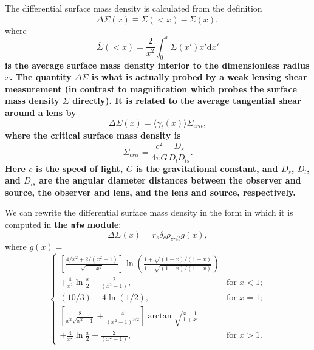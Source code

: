 \documentclass[twocolumn]{aastex6}
\newcommand{\code}{\lstinline[style=codeintext]}
\begin{document}
The differential surface mass density is calculated from the definition
\begin{equation}\label{dsigma}
\Delta\Sigma(x) \equiv  \overline{\Sigma}(<x) - \Sigma(x),
\end{equation}
where
\begin{equation}\label{sigbar}
\overline{\Sigma}(<x) = \frac{2}{x^2} \int_0^{x} \Sigma(x') x' \mathrm{d}x'
\end{equation}
{\bf is the average surface mass density interior to the dimensionless radius $x$. The quantity $\Delta\Sigma$ is what is actually probed by a weak lensing shear measurement (in contrast to magnification which probes the surface mass density $\Sigma$ directly). It is related to the average tangential shear around a lens by}
\begin{equation}
\Delta\Sigma(x) = \langle \gamma_t(x) \rangle \Sigma_{crit},
\end{equation}
{\bf where the critical surface mass density is}
\begin{equation}
\Sigma_{crit} = \frac{c^2}{4 \pi G}\frac{D_s}{D_l D_{ls}}.
\end{equation}
{\bf Here $c$ is the speed of light, $G$ is the gravitational constant, and $D_s$, $D_l$, and $D_{ls}$ are the angular diameter distances between the observer and source, the observer and lens, and the lens and source, respectively.}

We can rewrite the differential surface mass density in the form in which it is computed in {\bf the \code{nfw} module}:
\begin{equation}
     \Delta\Sigma(x) = r_s \delta_c \rho_{crit} g(x),
\end{equation}
where  $g(x) = $
\begin{equation}
    \begin{cases}

    \left[ \frac{4 / x^2 + 2/ (x^2 - 1)}{\sqrt{1 - x^2}} \right] \ln \left( \frac{1 + \sqrt{(1-x) / (1+x)} }{1 - \sqrt{(1-x) / (1+x)} } \right) \\ + \frac{4}{x^2} \ln \frac{x}{2} - \frac{2}{(x^2 - 1)}, & \text{for } x < 1; \\

    (10/3) + 4 \ln(1/2), & \text{for } x = 1; \\

    \left[ \frac{8}{x^2 \sqrt{x^2 - 1}} + \frac{4}{(x^2 - 1)^{3/2}} \right] \arctan\sqrt{\frac{x-1}{1+x}} \\ + \frac{4}{x^2} \ln \frac{x}{2} - \frac{2}{(x^2 - 1)}, & \text{for } x > 1.

    \end{cases}
\end{equation}
\end{document}
